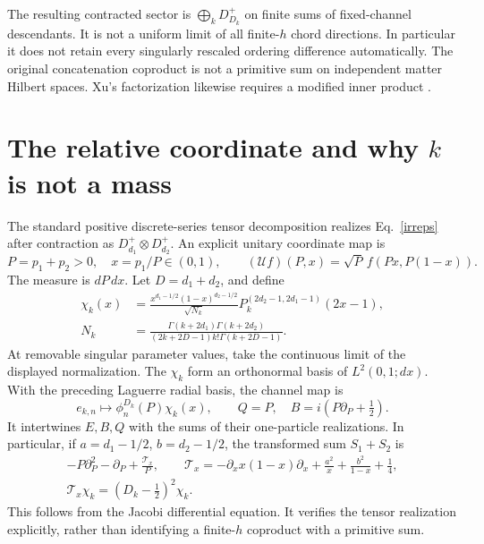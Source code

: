 \documentclass[11pt,a4paper]{article}
\begin{document}
The resulting contracted sector is $\bigoplus_k D^+_{D_k}$ on
finite sums of fixed-channel descendants. It is not a uniform
limit of all finite-$h$ chord directions. In particular it does not
retain every singularly rescaled ordering difference automatically.
The original concatenation coproduct is not a primitive sum on
independent matter Hilbert spaces. Xu's factorization likewise
requires a modified inner product \cite{Xu}.

\newpage
\section{The relative coordinate and why $k$ is not a mass}
The standard positive discrete-series tensor decomposition
\cite{KV,J} realizes Eq.~\eqref{irreps} after contraction as
$D^+_{d_1}\otimes D^+_{d_2}$. An explicit unitary coordinate map is
\begin{equation}
 P=p_1+p_2>0,\quad x=p_1/P\in(0,1),\qquad
 (\mathcal U f)(P,x)=\sqrt P\,f(Px,P(1-x)).
\end{equation}
The measure is $dP\,dx$. Let $D=d_1+d_2$, and define
\begin{align}
 \chi_k(x)&=\frac{x^{d_1-1/2}(1-x)^{d_2-1/2}}{\sqrt{N_k}}
 P_k^{(2d_2-1,2d_1-1)}(2x-1),\nonumber\\
 N_k&=\frac{\Gamma(k+2d_1)\Gamma(k+2d_2)}
 {(2k+2D-1)k!\Gamma(k+2D-1)}.\label{jacobi}
\end{align}
At removable singular parameter values, take the continuous limit
of the displayed normalization. The $\chi_k$ form an orthonormal
basis of $L^2(0,1;dx)$. With the preceding Laguerre radial basis,
the channel map is
\begin{equation}
 e_{k,n}\longmapsto\phi_n^{D_k}(P)\chi_k(x),\qquad
 Q=P,\quad B=i(P\partial_P+\tfrac12).
\end{equation}
It intertwines $E,B,Q$ with the sums of their one-particle
realizations. In particular, if $a=d_1-1/2$, $b=d_2-1/2$, the
transformed sum $S_1+S_2$ is
\begin{gather}
 -P\partial_P^2-\partial_P+\frac{\mathcal T_x}{P},\qquad
 \mathcal T_x=-\partial_x x(1-x)\partial_x+\frac{a^2}{x}
 +\frac{b^2}{1-x}+\frac14,\nonumber\\
 \mathcal T_x\chi_k=(D_k-\tfrac12)^2\chi_k.\label{T}
\end{gather}
This follows from the Jacobi differential equation. It verifies the
tensor realization explicitly, rather than identifying a finite-$h$
coproduct with a primitive sum.
\end{document}
